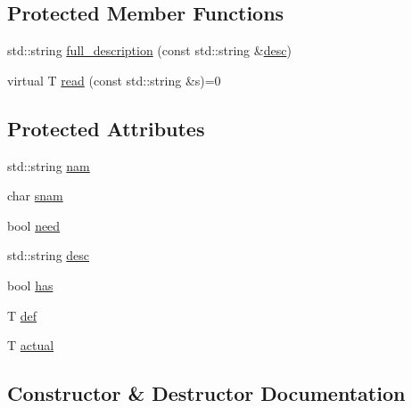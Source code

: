 \subsection*{Protected Member Functions}
\begin{DoxyCompactItemize}
\item 
std\+::string \mbox{\hyperlink{classcmdline_1_1parser_1_1option__with__value_aa7dd340235afd5dd99b5d70692d8346c}{full\+\_\+description}} (const std\+::string \&\mbox{\hyperlink{classcmdline_1_1parser_1_1option__with__value_aab2cea1b63e3d310e10d00810d91ddb0}{desc}})
\item 
virtual T \mbox{\hyperlink{classcmdline_1_1parser_1_1option__with__value_acb922af893f383b1e00d355d7f3b6b75}{read}} (const std\+::string \&s)=0
\end{DoxyCompactItemize}
\subsection*{Protected Attributes}
\begin{DoxyCompactItemize}
\item 
std\+::string \mbox{\hyperlink{classcmdline_1_1parser_1_1option__with__value_ac8003069cfb2662b8dd230dbfac9bd99}{nam}}
\item 
char \mbox{\hyperlink{classcmdline_1_1parser_1_1option__with__value_a176bf293810fe0a9846585da1bef7ae5}{snam}}
\item 
bool \mbox{\hyperlink{classcmdline_1_1parser_1_1option__with__value_adb73da6126c1ea28a2375c5b94ece4c6}{need}}
\item 
std\+::string \mbox{\hyperlink{classcmdline_1_1parser_1_1option__with__value_aab2cea1b63e3d310e10d00810d91ddb0}{desc}}
\item 
bool \mbox{\hyperlink{classcmdline_1_1parser_1_1option__with__value_ac36040a12a258dfebd9240b3061ec157}{has}}
\item 
T \mbox{\hyperlink{classcmdline_1_1parser_1_1option__with__value_a0d856f6886e383f0fe2407a95c5f590b}{def}}
\item 
T \mbox{\hyperlink{classcmdline_1_1parser_1_1option__with__value_a0508f4b6088b0c14d256a2ec2bc4bdb8}{actual}}
\end{DoxyCompactItemize}


\subsection{Constructor \& Destructor Documentation}
\mbox{\label{classcmdline_1_1parser_1_1option__with__value_a5cfab4623041433b5a5a7f211eee23c9}} 
